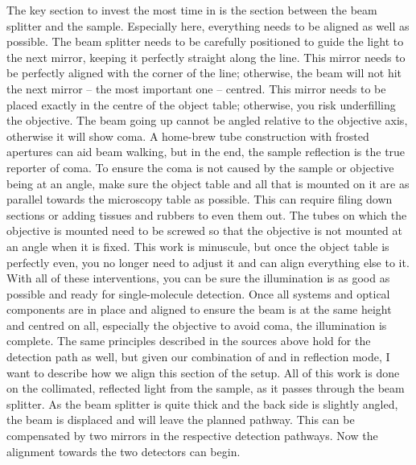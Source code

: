         The key section to invest the most time in is the section between the beam splitter and the sample. Especially here, everything needs to be aligned as well as possible. The beam splitter needs to be carefully positioned to guide the light to the next mirror, keeping it perfectly straight along the line. This mirror needs to be perfectly aligned with the corner of the line; otherwise, the beam will not hit the next mirror -- the most important one -- centred. This mirror needs to be placed exactly in the centre of the object table; otherwise, you risk underfilling the objective. The beam going up cannot be angled relative to the objective axis, otherwise it will show \gls{coma}. A home-brew tube construction with frosted apertures can aid beam walking\cite{felcher2024design}, but in the end, the sample reflection is the true reporter of \gls{coma}. To ensure the \gls{coma} is not caused by the sample or objective being at an angle, make sure the object table and all that is mounted on it are as parallel towards the microscopy table as possible. This can require filing down sections or adding tissues and rubbers to even them out. The tubes on which the objective is mounted need to be screwed so that the objective is not mounted at an angle when it is fixed. This work is minuscule, but once the object table is perfectly even, you no longer need to adjust it and can align everything else to it. With all of these interventions, you can be sure the illumination is as good as possible and ready for single-molecule detection. 
		Once all systems and optical components are in place and aligned to ensure the beam is at the same height and centred on all, especially the objective to avoid coma, the illumination is complete. The same principles described in the sources above hold for the detection path as well, but given our combination of \fl and \scat in reflection mode, I want to describe how we align this section of the setup. All of this work is done on the collimated, reflected light from the sample, as it passes through the beam splitter. As the beam splitter is quite thick and the back side is slightly angled, the beam is displaced and will leave the planned pathway. This can be compensated by two mirrors in the respective detection pathways. Now the alignment towards the two detectors can begin. \\ 
